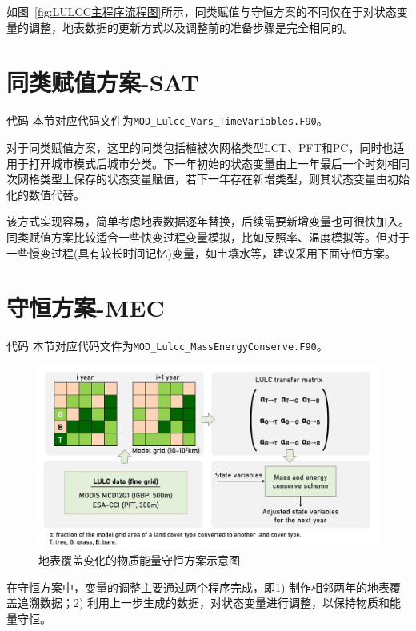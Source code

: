 如图~\ref{fig:LULCC主程序流程图}所示，同类赋值与守恒方案的不同仅在于对状态变量的调整，地表数据的更新方式以及调整前的准备步骤是完全相同的。

\section{同类赋值方案-SAT}
\begin{mymdframed}{代码}
本节对应代码文件为\texttt{MOD\_Lulcc\_Vars\_TimeVariables.F90}。
\end{mymdframed}

对于同类赋值方案，这里的同类包括植被次网格类型LCT、PFT和PC，同时也适用于打开城市模式后城市分类。下一年初始的状态变量由上一年最后一个时刻相同次网格类型上保存的状态变量赋值，若下一年存在新增类型，则其状态变量由初始化的数值代替。

该方式实现容易，简单考虑地表数据逐年替换，后续需要新增变量也可很快加入。同类赋值方案比较适合一些快变过程变量模拟，比如反照率、温度模拟等。但对于一些慢变过程(具有较长时间记忆)变量，如土壤水等，建议采用下面守恒方案。

\section{守恒方案-MEC}
\begin{mymdframed}{代码}
本节对应代码文件为\texttt{MOD\_Lulcc\_MassEnergyConserve.F90}。
\end{mymdframed}

{
\begin{figure}[htbp]
\centering
\includegraphics[width=\textwidth]{Figures/土地利用与土地覆盖变化模拟/LULCC流程图.png}
\caption{地表覆盖变化的物质能量守恒方案示意图}
\label{fig:LULCC流程图}
\end{figure}
}

在守恒方案中，变量的调整主要通过两个程序完成，即1) 制作相邻两年的地表覆盖追溯数据；2) 利用上一步生成的数据，对状态变量进行调整，以保持物质和能量守恒。

